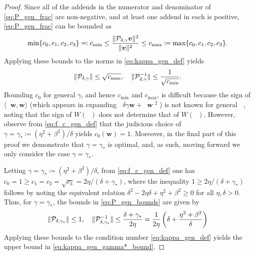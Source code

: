 \documentclass[review]{siamart}
\DeclareMathOperator{\cL}{\widehat{\mathcal{L}}}
\DeclareMathOperator{\cLs}{\widehat{\mathcal{L}}^2}
\DeclareMathOperator{\bVert}{\big\Vert}
\begin{document}
\begin{proof}
Since all of the addends in the numerator and denominator of \eqref{eq:P_gen_frac} are non-negative, and at least one addend in each is positive, \eqref{eq:P_gen_frac} can be bounded as
\begin{align*}
\min \{ c_0, c_1, c_2, c_3 \} \eqqcolon c_{\min}
\leq
\frac{\Vert {\cal P}_{\delta,\gamma} \bm{v} \Vert^2}{\Vert \bm{v} \Vert^2} 
\leq c_{\max} 
\coloneqq \max \{ c_0, c_1, c_2, c_3 \}.
\end{align*}
Applying these bounds to the norms in \eqref{eq:kappa_gen_def} yields
\begin{align} \label{eq:P_gen_bounds}
\Vert {\cal P}_{\delta, \gamma} \Vert \leq \sqrt{c_{\max}}, 
\quad
\Vert {\cal P}_{\delta, \gamma}^{-1} \Vert \leq \frac{1}{\sqrt{c_{\min}}}.
\end{align}
%
Bounding $c_0$ for general $\gamma$, and hence $c_{\min}$ and $c_{\max}$, is
difficult because the sign of $\langle \cLs \bm{w}, \bm{w} \rangle$ (which
appears in expanding $\bVert \delta \gamma \bm{w} + \cLs \bm{w} \bVert^2$) is not
known for general $\cL$, noting that the sign of $W(\cL)$ does not determine
that of $W(\cLs)$. However, observe from \eqref{eq:f_c_gen_def} that the judicious
choice of $\gamma = \gamma_* \coloneqq (\eta^2 + \beta^2)/\delta$ yields $c_0(\bm{w}) = 1$.
Moreover, in the final part of this proof we demonstrate that
$\gamma = \gamma_*$ is optimal, and, as such, moving forward we
only consider the case $\gamma = \gamma_*$.

Letting $\gamma = \gamma_* \coloneqq (\eta^2 + \beta^2)/\delta$, from
\eqref{eq:f_c_gen_def} one has $c_0 = 1 \geq c_1 = c_2 = \sqrt{c_3} = 2
\eta/(\delta + \gamma_*)$, where the inequality $1 \geq 2 \eta/(\delta +
\gamma_*)$ follows by noting the equivalent relation $\delta^2
-2\eta\delta+\eta^2+\beta^2 \geq 0$ for all $\eta,\delta>0$. Thus, for $\gamma =
\gamma_*$, the bounds in \eqref{eq:P_gen_bounds} are given by
\begin{align}
\label{eq:P_gen_gamma*_bounds}
\Vert {\cal P}_{\delta,\gamma_*} \Vert \leq 1,
\quad
\Vert {\cal P}_{\delta,\gamma_*}^{-1} \Vert 
\leq \frac{\delta + \gamma_*}{2 \eta}
= \frac{1}{2 \eta} \left( \delta + \frac{\eta^2 + \beta^2}{\delta} \right)
\end{align}
Applying these bounds to the condition number \eqref{eq:kappa_gen_def}
yields the upper bound in \eqref{eq:kappa_gen_gamma*_bound}.


\end{proof}
\end{document}
